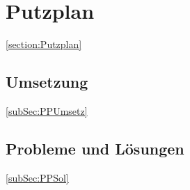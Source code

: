 \section{Putzplan}\ref{section:Putzplan}

\subsection{Umsetzung}\ref{subSec:PPUmsetz}

\subsection{Probleme und Lösungen}\ref{subSec:PPSol}


